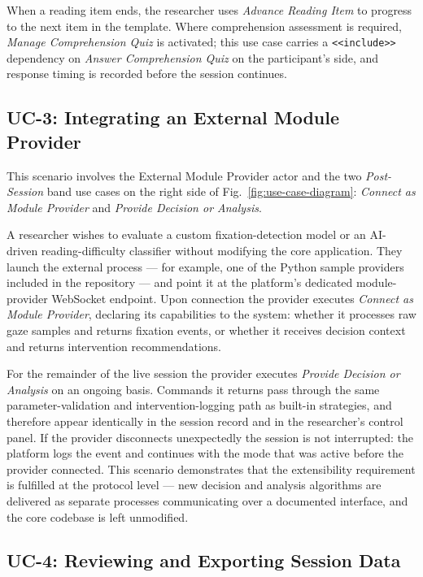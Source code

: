 When a reading item ends, the researcher uses \textit{Advance Reading Item} to
progress to the next item in the template.
Where comprehension assessment is required, \textit{Manage Comprehension Quiz}
is activated; this use case carries a \texttt{<<include>>} dependency on
\textit{Answer Comprehension Quiz} on the participant's side, and response
timing is recorded before the session continues.

\subsection{UC-3: Integrating an External Module Provider}
\label{sec:uc3}

This scenario involves the External Module Provider actor and the two
\textit{Post-Session} band use cases on the right side of
Fig.~\ref{fig:use-case-diagram}: \textit{Connect as Module Provider} and
\textit{Provide Decision or Analysis}.

A researcher wishes to evaluate a custom fixation-detection model or an
AI-driven reading-difficulty classifier without modifying the core application.
They launch the external process --- for example, one of the Python sample
providers included in the repository --- and point it at the platform's dedicated
module-provider WebSocket endpoint.
Upon connection the provider executes \textit{Connect as Module Provider},
declaring its capabilities to the system: whether it processes raw gaze samples
and returns fixation events, or whether it receives decision context and returns
intervention recommendations.

For the remainder of the live session the provider executes \textit{Provide
Decision or Analysis} on an ongoing basis.
Commands it returns pass through the same parameter-validation and
intervention-logging path as built-in strategies, and therefore appear
identically in the session record and in the researcher's control panel.
If the provider disconnects unexpectedly the session is not interrupted: the
platform logs the event and continues with the mode that was active before the
provider connected.
This scenario demonstrates that the extensibility requirement is fulfilled at
the protocol level --- new decision and analysis algorithms are delivered as
separate processes communicating over a documented interface, and the core
codebase is left unmodified.

\subsection{UC-4: Reviewing and Exporting Session Data}
\label{sec:uc4}


